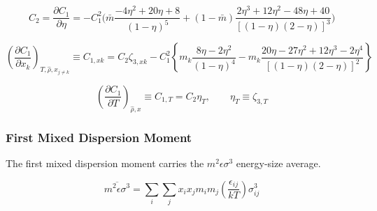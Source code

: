 \documentclass[12pt, letterpaper]{article}
\begin{document}
\begin{equation}
    C_{2}
    =\frac{\partial C_{1}}{\partial\eta}
    =- C_{1}^{2}\biggl(
    \bar{m}\frac{-4\eta^{2}+20\eta+8}{\left(1-\eta\right)^{5}}
    +(1-\bar{m})\frac{2\eta^{3}+12\eta^{2}-48\eta+40}{\left[(1-\eta)(2-\eta)\right]^{3}}
    \biggr)
    \label{eq:c2_disp}
\end{equation}


\begin{equation}
    \left(\frac{\partial C_{1}}{\partial x_{k}}\right)_{T,\hat{\rho},x_{j\neq k}}
    \equiv C_{1,xk}
    =C_{2}\zeta_{3,xk}-C_{1}^{2}\left\{m_{k}\frac{8\eta-2\eta^{2}}{\left(1-\eta\right)^{4}}-m_{k}\frac{20\eta-27\eta^{2}+12\eta^{3}-2\eta^{4}}{\left[(1-\eta)(2-\eta)\right]^{2}}\right\}
    \label{eq:c1_xk}
\end{equation}


\begin{equation}
    \left(\frac{\partial C_1}{\partial T}\right)_{\hat{\rho},x}
    \equiv C_{1,T}
    =C_2\eta_T,
    \qquad \eta_T\equiv\zeta_{3,T}
    \label{eq:c1_dT}
\end{equation}

\subsubsection{First Mixed Dispersion Moment}

The first mixed dispersion moment carries the \(m^2\epsilon\sigma^3\) energy-size average.

\begin{equation}
    \overline{m^2 \epsilon \sigma^3}=\sum_{i} \sum_{j} x_{i} x_{j} m_{i} m_{j}\left(\frac{\epsilon_{i j}}{k T}\right) \sigma_{i j}^3
    \label{eq:m2epssigma3_bar}
\end{equation}
\end{document}
